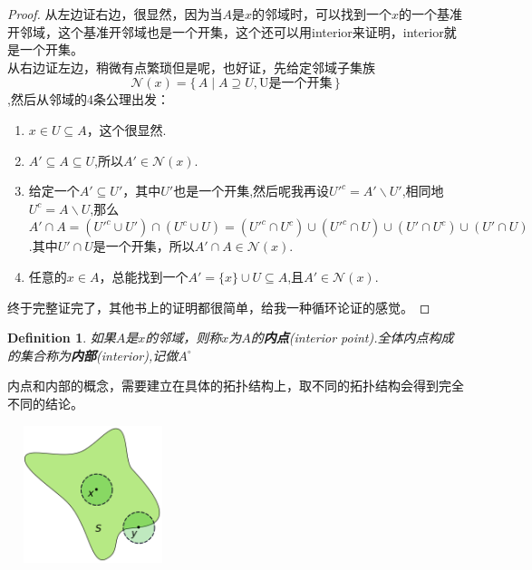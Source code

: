 \documentclass{article}
\newtheorem{definition}[theorem]{Definition}
\newcommand\Set[2]{\{\,#1\mid#2\,\}} %
\begin{document}
\begin{proof}
从左边证右边，很显然，因为当$A$是$x$的邻域时，可以找到一个$x$的一个基准开邻域，这个基准开邻域也是一个开集，这个还可以用interior来证明，interior就是一个开集。\\
从右边证左边，稍微有点繁琐但是呢，也好证，先给定邻域子集族\[\mathcal{N}(x)=\Set{A}{A \supseteq U, \text{U是一个开集}}\],然后从邻域的4条公理出发：
\begin{enumerate}
	\item $x \in U \subseteq A$，这个很显然.
	\item $A' \subseteq A \subseteq U$,所以$A' \in \mathcal{N}(x)$.
	\item 给定一个$A' \subseteq U'$，其中$U'$也是一个开集,然后呢我再设${U'}^c=A' \smallsetminus U'$,相同地$U^c= A \smallsetminus U$,那么$A' \cap A =({U'}^c \cup U') \cap (U^c \cup U)= (U'^c \cap U^c) \cup (U'^c \cap U) \cup (U' \cap U^c ) \cup (U' \cap U)$.其中$U' \cap U$是一个开集，所以$A' \cap A \in \mathcal{N}(x) $.
	\item 任意的$x \in A$，总能找到一个$A' = \{x\} \cup U \subseteq A$,且$A' \in   \mathcal{N}(x)$.
\end{enumerate}

终于完整证完了，其他书上的证明都很简单，给我一种循环论证的感觉。
\end{proof}




\begin{definition}
如果$A$是$x$的邻域，则称$x$为$A$的\textbf{内点}(interior point).全体内点构成的集合称为\textbf{内部}(interior),记做$A^{\circ}$
\end{definition}

内点和内部的概念，需要建立在具体的拓扑结构上，取不同的拓扑结构会得到完全不同的结论。

\begin{center}
\includegraphics[width=5cm, height=4cm]{images/Interior_illustration.png}
\end{center}
\end{document}
